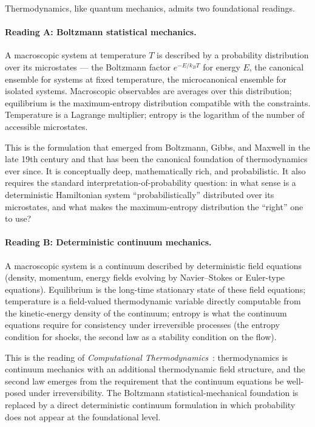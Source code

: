 Thermodynamics, like quantum mechanics, admits two foundational readings.

\paragraph{Reading A: Boltzmann statistical mechanics.}
A macroscopic system at temperature $T$ is described by a probability distribution over its microstates --- the Boltzmann factor $e^{-E/k_B T}$ for energy $E$, the canonical ensemble for systems at fixed temperature, the microcanonical ensemble for isolated systems. Macroscopic observables are averages over this distribution; equilibrium is the maximum-entropy distribution compatible with the constraints. Temperature is a Lagrange multiplier; entropy is the logarithm of the number of accessible microstates.

This is the formulation that emerged from Boltzmann, Gibbs, and Maxwell in the late 19th century and that has been the canonical foundation of thermodynamics ever since. It is conceptually deep, mathematically rich, and probabilistic. It also requires the standard interpretation-of-probability question: in what sense is a deterministic Hamiltonian system ``probabilistically'' distributed over its microstates, and what makes the maximum-entropy distribution the ``right'' one to use?

\paragraph{Reading B: Deterministic continuum mechanics.}
A macroscopic system is a continuum described by deterministic field equations (density, momentum, energy fields evolving by Navier--Stokes or Euler-type equations). Equilibrium is the long-time stationary state of these field equations; temperature is a field-valued thermodynamic variable directly computable from the kinetic-energy density of the continuum; entropy is what the continuum equations require for consistency under irreversible processes (the entropy condition for shocks, the second law as a stability condition on the flow).

This is the reading of \emph{Computational Thermodynamics}~\cite{BodyAndSoulV}: thermodynamics is continuum mechanics with an additional thermodynamic field structure, and the second law emerges from the requirement that the continuum equations be well-posed under irreversibility. The Boltzmann statistical-mechanical foundation is replaced by a direct deterministic continuum formulation in which probability does not appear at the foundational level.

